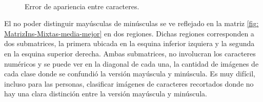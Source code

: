 		\begin{figure}[htbp]
			\centering
			\\
			\caption[Error de apariencia]{Error de apariencia entre caracteres.}
			\label{fig: Error-Apariencia}
		\end{figure}


	El no poder distinguir mayúsculas de minúsculas se ve reflejado en la matriz \ref{fig: MatrizIns-Mixtas-media-mejor} en dos regiones. Dichas regiones corresponden a dos submatrices, la primera ubicada en la esquina inferior izquiera y la segunda en la esquina superior derecha. Ambas submatrices, no involucran los caracteres numéricos y se puede ver en la diagonal de cada una, la cantidad de imágenes de cada clase donde se confundió la versión mayúscula y minúscula. Es muy difícil, incluso para las personas, clasificar imágenes de caracteres recortados donde no hay una clara distinción entre la versión mayúscula y minúscula.

